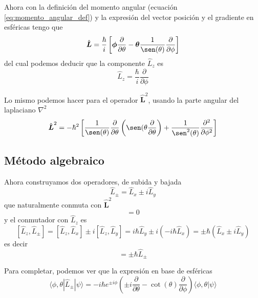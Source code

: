 \documentclass{book}
\numberwithin{equation}{section} %
\begin{document}
Ahora con la definición del momento angular (ecuación \ref{eq:momento_angular_def}) y la expresión del vector posición y el gradiente en esféricas tengo que
\begin{equation}
    \hat{\boldsymbol{L}} = \frac{\hbar}{i} \left[ \boldsymbol{\phi} \frac{\partial}{\partial \theta} - \boldsymbol{\theta} \frac{1}{\sen(\theta)} \frac{\partial}{\partial \phi} \right]
\end{equation}
del cual podemos deducir que la componente $\hat{L}_z$ es
\begin{equation}
    \hat{L}_z = \frac{\hbar}{i} \frac{\partial}{\partial \phi}
\end{equation}

Lo mismo podemos hacer para el operador $\hat{\boldsymbol{L}}^2$, usando la parte angular del laplaciano $\nabla^2$
\begin{equation}
\hat{\boldsymbol{L}}^2 = - \hbar^2  \left[ \frac{1}{\sen(\theta)} \frac{\partial}{\partial \theta} \left(\sen(\theta \frac{\partial}{\partial \theta} \right) + \frac{1}{\sen^2(\theta)} \frac{\partial^2}{\partial \phi^2} \right]
\end{equation}

\subsection{Método algebraico}

Ahora construyamos dos operadores, de subida y bajada
\begin{equation}
    \hat{L}_{\pm} = \hat{L}_x \pm i \hat{L}_y
\end{equation}
que naturalmente conmuta con $\hat{\boldsymbol{L}}^2$
\begin{equation}
    [\hat{\boldsymbol{L}}^2, \hat{L}_\pm] = 0
\end{equation}
y el conmutador con $\hat{L}_z$ es
\[ [\hat{L}_z, \hat{L}_\pm ] = [\hat{L}_z, \hat{L}_x] \pm i [\hat{L}_z, \hat{L}_y] = i\hbar \hat{L}_y \pm i (-i\hbar \hat{L}_x) = \pm \hbar (\hat{L}_x \pm i \hat{L}_y)\]
es decir
\begin{equation}
    [\hat{L}_z, \hat{L}_\pm ] = \pm \hbar \hat{L}_\pm
\end{equation}

Para completar, podemos ver que la expresión en base de esféricas
\begin{equation}
    \langle \phi, \theta | \hat{L}_\pm | \psi \rangle = - i \hbar e^{\pm i \phi}\left(\pm i \frac{\partial}{\partial \theta} - \cot(\theta) \frac{\partial}{\partial \phi} \right) \langle \phi, \theta | \psi \rangle
    \label{eq:momento_operador_subibda_coordeanas}
\end{equation}
\end{document}
